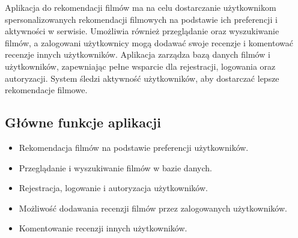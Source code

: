 \documentclass[../main.tex]{subfiles}
\begin{document}
Aplikacja do rekomendacji filmów ma na celu dostarczanie użytkownikom spersonalizowanych rekomendacji filmowych na podstawie ich preferencji i aktywności w serwisie. Umożliwia również przeglądanie oraz wyszukiwanie filmów, a zalogowani użytkownicy mogą dodawać swoje recenzje i komentować recenzje innych użytkowników.
Aplikacja zarządza bazą danych filmów i użytkowników, zapewniając pełne wsparcie dla rejestracji, logowania oraz autoryzacji. System śledzi aktywność użytkowników, aby dostarczać lepsze rekomendacje filmowe.

\subsection{Główne funkcje aplikacji}
\begin{itemize}
	\item Rekomendacja filmów na podstawie preferencji użytkowników.
    \item Przeglądanie i wyszukiwanie filmów w bazie danych.
    \item Rejestracja, logowanie i autoryzacja użytkowników.
    \item Możliwość dodawania recenzji filmów przez zalogowanych użytkowników.
    \item Komentowanie recenzji innych użytkowników.
\end{itemize}
\end{document}
